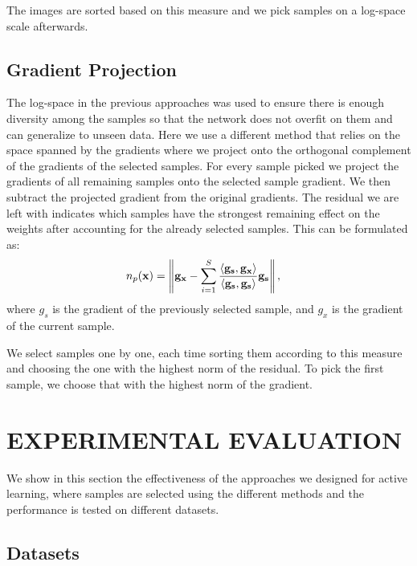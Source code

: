 \documentclass[letterpaper, 10 pt, conference]{ieeeconf}  %
\begin{document}
The images are sorted based on this measure and we pick samples on a log-space scale afterwards.

\subsection{Gradient Projection} \label{sec:grad_proj}

The log-space in the previous approaches was used to ensure there is enough diversity among the samples so that the network does not overfit on them and can generalize to unseen data. Here we use a different method that relies on the space spanned by the gradients where we project onto the orthogonal complement of the gradients of the selected samples. For every sample picked we project the gradients of all remaining samples onto the selected sample gradient. We then subtract the projected gradient from the original gradients. The residual we are left with indicates which samples have the strongest remaining effect on the weights after accounting for the already selected samples. This can be formulated as:
\begin{align}
n_p(\bold{x}) &=  \left\lVert \bold{g_x} - \sum_{i=1}^S \frac{\left\langle \bold{g_s}, \bold{g_x} \right\rangle}{\left\langle \bold{g_s}, \bold{g_s} \right\rangle} \bold{g_s} \right\rVert,
\end{align}
where $g_s$ is the gradient of the previously selected sample, and $g_x$ is the gradient of the current sample.

We select samples one by one, each time sorting them according to this measure and choosing the one with the highest norm of the residual. To pick the first sample, we choose that with the highest norm of the gradient.



\section{EXPERIMENTAL EVALUATION}
\label{sec:exp}


We show in this section the effectiveness of the approaches we designed for active learning, where samples are selected using the different methods and the performance is tested on different datasets. 


\subsection{Datasets}
\end{document}
